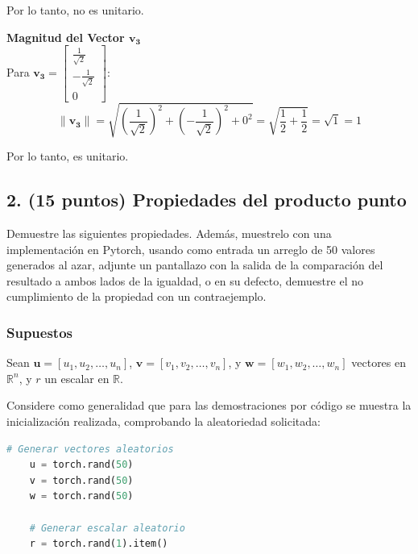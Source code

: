 \documentclass[12 pt]{article}
\begin{document}
\begin{center}
Por lo tanto, no es unitario.\\
\end{center}

\textbf{Magnitud del Vector \(\mathbf{v_3}\)}\\

Para \(\mathbf{v_3} = \begin{bmatrix} \frac{1}{\sqrt{2}} \\ -\frac{1}{\sqrt{2}} \\ 0 \end{bmatrix}\):
\[
\|\mathbf{v_3}\| = \sqrt{\left(\frac{1}{\sqrt{2}}\right)^2 + \left(-\frac{1}{\sqrt{2}}\right)^2 + 0^2}
= \sqrt{\frac{1}{2} + \frac{1}{2}}
= \sqrt{1}
= 1
\]

\begin{center}
Por lo tanto, es unitario.
\end{center}

\subsection*{2. (15 puntos) Propiedades del producto punto}

Demuestre las siguientes propiedades. Además, muestrelo con una implementación en Pytorch, usando como entrada un arreglo de 50 valores generados al azar, adjunte un pantallazo con la salida de la comparación del resultado a ambos lados de la igualdad, o en su defecto, demuestre el no cumplimiento de la propiedad con un contraejemplo.

\subsubsection*{Supuestos}

Sean \(\mathbf{u} = [u_1, u_2, \dots, u_n]\), \(\mathbf{v} = [v_1, v_2, \dots, v_n]\), y \(\mathbf{w} = [w_1, w_2, \dots, w_n]\) vectores en \(\mathbb{R}^n\), y \(r\) un escalar en \(\mathbb{R}\).

Considere como generalidad que para las demostraciones por código se muestra la inicialización realizada, comprobando la aleatoriedad solicitada:
\begin{lstlisting}[language=Python]
    # Generar vectores aleatorios
    u = torch.rand(50)
    v = torch.rand(50)
    w = torch.rand(50)
    
    # Generar escalar aleatorio
    r = torch.rand(1).item()
\end{lstlisting}
\end{document}
